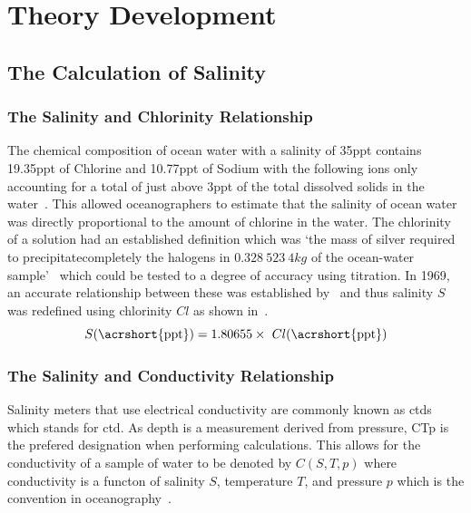 \chapter{Theory Development}\label{ch:theory-development}

\section{The Calculation of Salinity}\label{sec:the-calculation-of-salinity}

\subsection{The Salinity and Chlorinity Relationship}\label{subsec:the-salinity-chlorinity-relationship}

The chemical composition of ocean water with a salinity of 35\acrshort{ppt} contains 19.35\acrshort{ppt} of Chlorine and 10.77\acrshort{ppt} of Sodium with the following ions only accounting for a total of just above 3\acrshort{ppt} of the total dissolved solids in the water~\cite{britannica_seawater_encyclopaedia_2024}.
This allowed oceanographers to estimate that the salinity of ocean water was directly proportional to the amount of chlorine in the water.
The chlorinity of a solution had an established definition which was `the mass of silver required to precipitatecompletely the halogens in $0.328\ 523\ 4 kg$ of the ocean-water sample'~\cite{wooster_redefinition_of_salinity_1969} which could be tested to a degree of accuracy using titration.
In 1969, an accurate relationship between these was established by~ and thus salinity $S$ was redefined using chlorinity $Cl$ as shown in~.
\begin{equation}\label{eq:salinity-chlorinity}
    S (\text{\acrshort{ppt}}) = 1.80655 \times~Cl (\text{\acrshort{ppt}})
\end{equation}

\subsection{The Salinity and Conductivity Relationship}\label{subsec:the-salinity-conductivity-relationship}

Salinity meters that use electrical conductivity are commonly known as \acrshort{ctd}s which stands for \acrlong{ctd}.
As depth is a measurement derived from pressure, CTp is the prefered designation when performing calculations.
This allows for the conductivity of a sample of water to be denoted by $C(S, T, p)$ where conductivity is a functon of salinity $S$, temperature $T$, and pressure $p$ which is the convention in oceanography~\cite{lewis_salinity_definition_and_calculation_1978}.

